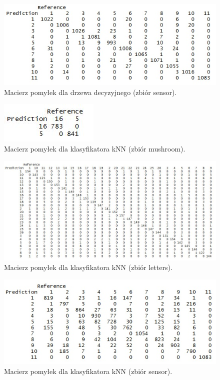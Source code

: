 \documentclass[11pt,a4paper,twoside]{article}
\begin{document}
\begin{figure}[H]
\centering
\includegraphics[scale=0.7]{confMatrixJ48_sensor.JPG}
\caption{Macierz pomyłek dla drzewa decyzyjnego (zbiór sensor).}
\label{confMatrixJ48_sensor}
\end{figure}


\begin{figure}[H]
\centering
\includegraphics[scale=0.65]{confMatrixKnn_mushroom.JPG}
\caption{Macierz pomyłek dla klasyfikatora kNN (zbiór mushroom).}
\label{confMatrixKnn_mushroom}
\end{figure}

\begin{figure}[H]
\centering
\includegraphics[scale=0.55]{confMatrixKnn_letters.JPG}
\caption{Macierz pomyłek dla klasyfikatora kNN (zbiór letters).}
\label{confMatrixKnn_letters}
\end{figure}

\begin{figure}[H]
\centering
\includegraphics[scale=0.63]{confMatrixKnn_sensor.JPG}
\caption{Macierz pomyłek dla klasyfikatora kNN (zbiór sensor).}
\label{confMatrixKnn_sensor}
\end{figure}
\end{document}

